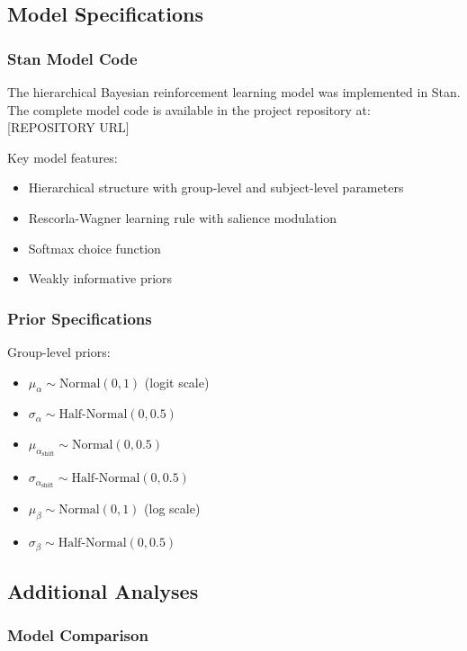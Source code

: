 \subsection{Model Specifications}

\subsubsection{Stan Model Code}

The hierarchical Bayesian reinforcement learning model was implemented in Stan. The complete model code is available in the project repository at: [REPOSITORY URL]

Key model features:
\begin{itemize}
\item Hierarchical structure with group-level and subject-level parameters
\item Rescorla-Wagner learning rule with salience modulation
\item Softmax choice function
\item Weakly informative priors
\end{itemize}

\subsubsection{Prior Specifications}

Group-level priors:
\begin{itemize}
\item $\mu_\alpha \sim \text{Normal}(0, 1)$ (logit scale)
\item $\sigma_\alpha \sim \text{Half-Normal}(0, 0.5)$
\item $\mu_{\alpha_{\text{shift}}} \sim \text{Normal}(0, 0.5)$
\item $\sigma_{\alpha_{\text{shift}}} \sim \text{Half-Normal}(0, 0.5)$
\item $\mu_\beta \sim \text{Normal}(0, 1)$ (log scale)
\item $\sigma_\beta \sim \text{Half-Normal}(0, 0.5)$
\end{itemize}

\subsection{Additional Analyses}

\subsubsection{Model Comparison}

